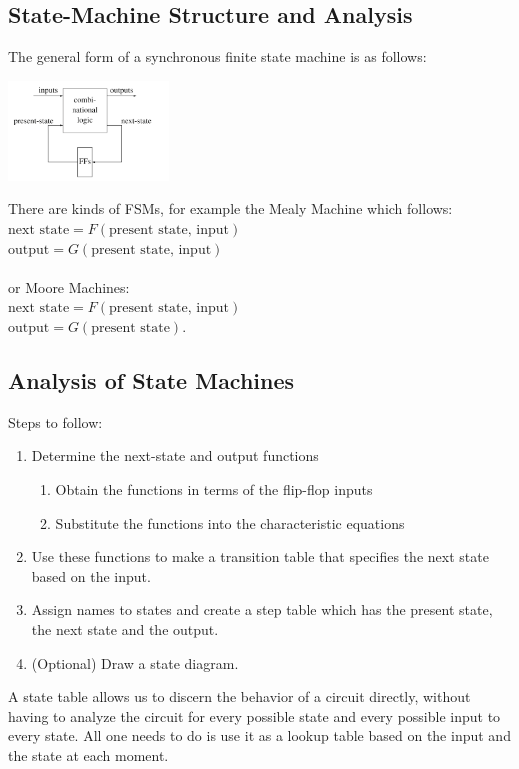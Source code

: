 \documentclass[nobib]{tufte-handout}
\begin{document}
    \subsection{State-Machine Structure and Analysis}
    The general form of a synchronous finite state machine is as follows:
    \begin{center}
        \includegraphics[height = 100px]{images/fsm_basic.png}
    \end{center}
    There are kinds of FSMs, for example the Mealy Machine which follows:\\
$\text{next state} = F(\text{present state, input})$\\
$\text{output} = G(\text{present state, input})$\\~\\
    or Moore Machines:\\
$\text{next state} = F(\text{present state, input})$\\
$\text{output} = G(\text{present state})$.\\
    \subsection{Analysis of State Machines}
    Steps to follow:
    \begin{enumerate}
        \item Determine the next-state and output functions
              \begin{enumerate}
                  \item Obtain the functions in terms of the flip-flop inputs
                  \item Substitute the functions into the characteristic equations
              \end{enumerate}
        \item Use these functions to make a transition table that specifies the next state
              based on the input.
        \item Assign names to states and create a step table which has the present state, the
              next state and the output.
        \item (Optional) Draw a state diagram.
    \end{enumerate}
    A state table allows us to discern the behavior of a circuit directly, without having to analyze the circuit for every possible state and every possible input to every state. All one needs to do is use it as a lookup table based on the input and the state at each moment.\\
\end{document}
